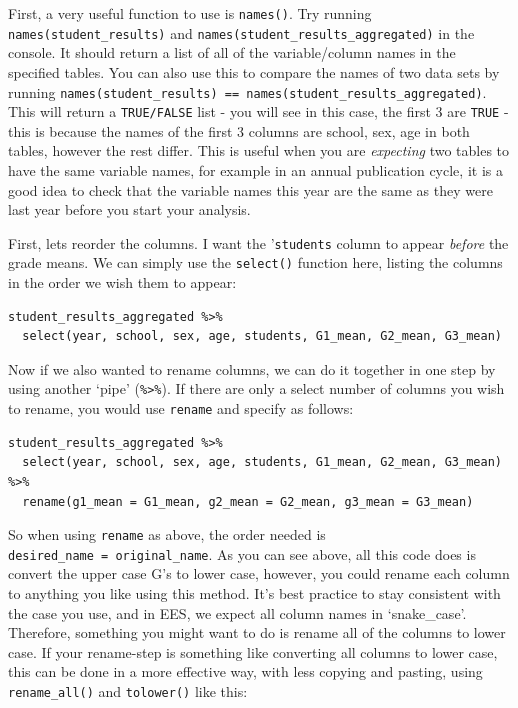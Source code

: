 \documentclass[
  12pt,
]{article}
\begin{document}
First, a very useful function to use is \texttt{names()}. Try running
\texttt{names(student\_results)} and
\texttt{names(student\_results\_aggregated)} in the console. It should
return a list of all of the variable/column names in the specified
tables. You can also use this to compare the names of two data sets by
running
\texttt{names(student\_results)\ ==\ names(student\_results\_aggregated)}.
This will return a \texttt{TRUE/FALSE} list - you will see in this case,
the first 3 are \texttt{TRUE} - this is because the names of the first 3
columns are school, sex, age in both tables, however the rest differ.
This is useful when you are \emph{expecting} two tables to have the same
variable names, for example in an annual publication cycle, it is a good
idea to check that the variable names this year are the same as they
were last year before you start your analysis.

First, lets reorder the columns. I want the '\texttt{students} column to
appear \emph{before} the grade means. We can simply use the
\texttt{select()} function here, listing the columns in the order we
wish them to appear:

\begin{verbatim}
student_results_aggregated %>%
  select(year, school, sex, age, students, G1_mean, G2_mean, G3_mean)
\end{verbatim}

Now if we also wanted to rename columns, we can do it together in one
step by using another `pipe' (\texttt{\%\textgreater{}\%}). If there are
only a select number of columns you wish to rename, you would use
\texttt{rename} and specify as follows:

\begin{verbatim}
student_results_aggregated %>%
  select(year, school, sex, age, students, G1_mean, G2_mean, G3_mean) %>%
  rename(g1_mean = G1_mean, g2_mean = G2_mean, g3_mean = G3_mean)
\end{verbatim}

So when using \texttt{rename} as above, the order needed is
\texttt{desired\_name\ =\ original\_name}. As you can see above, all
this code does is convert the upper case G's to lower case, however, you
could rename each column to anything you like using this method. It's
best practice to stay consistent with the case you use, and in EES, we
expect all column names in `snake\_case'. Therefore, something you might
want to do is rename all of the columns to lower case. If your
rename-step is something like converting all columns to lower case, this
can be done in a more effective way, with less copying and pasting,
using \texttt{rename\_all()} and \texttt{tolower()} like this:
\end{document}
